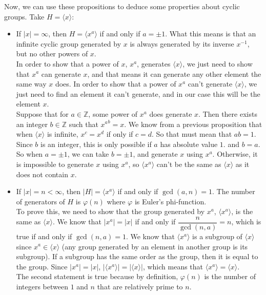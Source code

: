 \documentclass[12pt]{article}
\newcommand{\Z}{\mathbb{Z}}
\newcommand{\ang}[1]{\langle #1 \rangle}
\begin{document}
    Now, we can use these propositions to deduce some properties
    about cyclic groups.
    Take $H = \ang{x}$:
    \begin{itemize}[label=$\diamond$]
        \item 
            If $|x| = \infty$,
            then $H = \ang{x^a}$ if and only if $a = \pm 1$.
            What this means is that an infinite cyclic group
            generated by $x$
            is always generated by its inverse $x^{-1}$,
            but no other powers of $x$. \\
            In order to show that a power of $x$, $x^a$,
            generates $\ang{x}$,
            we just need to show that $x^a$ can generate $x$,
            and that means it can generate any other element
            the same way $x$ does.
            In order to show that a power of $x^a$
            can't generate $\ang{x}$,
            we just need to find an element it can't generate,
            and in our case this will be the element $x$. \\
            Suppose that for $a \in \Z$,
            some power of $x^a$ does generate $x$.
            Then there exists an integer $b \in \Z$
            such that ${x^a}^b = x$.
            We know from a previous proposition that when $\ang{x}$
            is infinite, $x^{c} = x^d$ if only if $c = d$.
            So that must mean that $ab = 1$.
            Since $b$ is an integer,
            this is only possible if $a$ has absolute value $1$.
            and $b = a$.
            So when $a = \pm 1$, we can take $b = \pm 1$,
            and generate $x$ using $x^a$.
            Otherwise, it is impossible to generate $x$ using $x^a$,
            so $\ang{x^a}$ can't be the same as $\ang{x}$
            as it does not contain $x$.
        \item
            If $|x| = n < \infty$, then $|H| = \ang{x^a}$
            if and only if $\gcd(a, n) = 1$.
            The number of generators of $H$ is $\varphi(n)$
            where $\varphi$ is Euler's phi-function. \\
            To prove this, we need to show that the group
            generated by $x^a$, $\ang{x^a}$,
            is the same as $\ang{x}$.
            We know that $|x^a| = |x|$
            if and only if $\dfrac{n}{\gcd(n, a)} = n$,
            which is true if and only if $\gcd(n, a) = 1$.
            We know that $\ang{x^a}$ is a subgroup of $\ang{x}$
            since $x^a \in \ang{x}$
            (any group generated by an element in another group
            is its subgroup).
            If a subgroup has the same order as the group,
            then it is equal to the group.
            Since $|x^a| = |x|$, $|\ang{x^a}| = |\ang{x}|$,
            which means that $\ang{x^a} = \ang{x}$. \\
            The second statement is true because by definition,
            $\varphi(n)$ is the number of integers
            between $1$ and $n$ that are relatively prime to $n$.
    \end{itemize}
\end{document}
